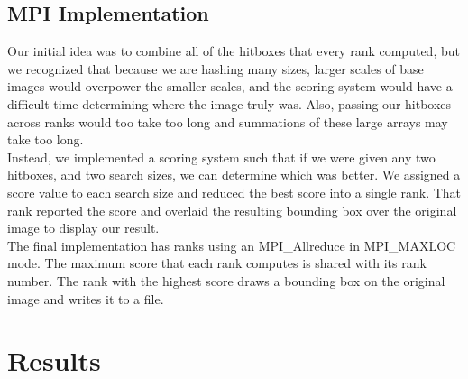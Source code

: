 \documentclass[10pt, journal]{vgtc}                %
\newcommand\tab[1][1cm]{\hspace*{#1}}
\begin{document}
\subsection{MPI Implementation}
\begin{flushleft}
\tab Our initial idea was to combine all of the hitboxes that every rank computed, but we recognized that because we are hashing many sizes, larger scales of base images would overpower the smaller scales, and the scoring system would have a difficult time determining where the image truly was. Also, passing our hitboxes across ranks would too take too long and summations of these large arrays may take too long. \\\smallskip
\tab Instead, we implemented a scoring system such that if we were given any two hitboxes, and two search sizes, we can determine which was better. We assigned a score value to each search size and reduced the best score into a single rank. That rank reported the score and overlaid the resulting bounding box over the original image to display our result. \\\smallskip
\tab The final implementation has ranks using an MPI\_Allreduce in MPI\_MAXLOC mode. The maximum score that each rank computes is shared with its rank number. The rank with the highest score draws a bounding box on the original image and writes it to a file.
\end{flushleft}
\section{Results}
\end{document}
